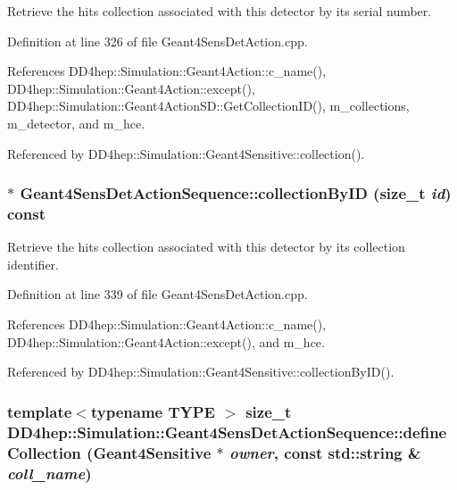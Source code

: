 Retrieve the hits collection associated with this detector by its serial number. 

Definition at line 326 of file Geant4SensDetAction.cpp.

References DD4hep::Simulation::Geant4Action::c\_\-name(), DD4hep::Simulation::Geant4Action::except(), DD4hep::Simulation::Geant4ActionSD::GetCollectionID(), m\_\-collections, m\_\-detector, and m\_\-hce.

Referenced by DD4hep::Simulation::Geant4Sensitive::collection().\hypertarget{class_d_d4hep_1_1_simulation_1_1_geant4_sens_det_action_sequence_af724af407cc2823ba81803760500462c}{
\subsubsection[{collectionByID}]{ $\ast$ Geant4SensDetActionSequence::collectionByID (size\_\-t {\em id}) const}}
\label{class_d_d4hep_1_1_simulation_1_1_geant4_sens_det_action_sequence_af724af407cc2823ba81803760500462c}


Retrieve the hits collection associated with this detector by its collection identifier. 

Definition at line 339 of file Geant4SensDetAction.cpp.

References DD4hep::Simulation::Geant4Action::c\_\-name(), DD4hep::Simulation::Geant4Action::except(), and m\_\-hce.

Referenced by DD4hep::Simulation::Geant4Sensitive::collectionByID().\hypertarget{class_d_d4hep_1_1_simulation_1_1_geant4_sens_det_action_sequence_af695ff3e1e2eee1b7a79a5d1c2a58cd5}{
\subsubsection[{defineCollection}]{\setlength{\rightskip}{0pt plus 5cm}template$<$typename TYPE $>$ size\_\-t DD4hep::Simulation::Geant4SensDetActionSequence::defineCollection ({\bf Geant4Sensitive} $\ast$ {\em owner}, \/  const std::string \& {\em coll\_\-name})}}
\label{class_d_d4hep_1_1_simulation_1_1_geant4_sens_det_action_sequence_af695ff3e1e2eee1b7a79a5d1c2a58cd5}


